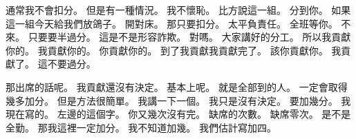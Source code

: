 \hypertarget{c01:cue:1770}{}通常我不會扣分。
\hypertarget{c01:cue:1771}{}但是有一種情況。
\hypertarget{c01:cue:1772}{}我不懷恥。
\hypertarget{c01:cue:1773}{}比方說這一組。
\hypertarget{c01:cue:1774}{}分到你。
\hypertarget{c01:cue:1775}{}如果這一組今天給我們放鴿子。
\hypertarget{c01:cue:1776}{}開對床。
\hypertarget{c01:cue:1777}{}那只要扣分。
\hypertarget{c01:cue:1778}{}太平負責任。
\hypertarget{c01:cue:1779}{}全班等你。
\hypertarget{c01:cue:1780}{}不來。
\hypertarget{c01:cue:1781}{}只要要半過分。
\hypertarget{c01:cue:1782}{}這是不是形容詐欺。
\hypertarget{c01:cue:1783}{}對嗎。
\hypertarget{c01:cue:1784}{}大家講好的分工。
\hypertarget{c01:cue:1785}{}所以我貢獻你的。
\hypertarget{c01:cue:1786}{}我貢獻你的。
\hypertarget{c01:cue:1787}{}你貢獻你的。
\hypertarget{c01:cue:1788}{}到了我貢獻我貢獻完了。
\hypertarget{c01:cue:1789}{}該你貢獻你。
\hypertarget{c01:cue:1790}{}我貢獻了。
\hypertarget{c01:cue:1791}{}這不要過分。

\hypertarget{c01:cue:1792}{}那出席的話呢。
\hypertarget{c01:cue:1793}{}我貢獻還沒有決定。
\hypertarget{c01:cue:1794}{}基本上呢。
\hypertarget{c01:cue:1795}{}就是全部到的人。
\hypertarget{c01:cue:1796}{}一定會取得幾多加分。
\hypertarget{c01:cue:1797}{}但是方法很簡單。
\hypertarget{c01:cue:1798}{}我講一下一個。
\hypertarget{c01:cue:1799}{}我只是沒有決定。
\hypertarget{c01:cue:1800}{}要加幾分。
\hypertarget{c01:cue:1801}{}我現在寫的。
\hypertarget{c01:cue:1802}{}左邊的這個字。
\hypertarget{c01:cue:1803}{}你又幾次沒有完。
\hypertarget{c01:cue:1804}{}缺席的次數。
\hypertarget{c01:cue:1805}{}缺席零次。
\hypertarget{c01:cue:1806}{}是不是全勤。
\hypertarget{c01:cue:1807}{}那我這裡一定加分。
\hypertarget{c01:cue:1808}{}我不知道加幾。
\hypertarget{c01:cue:1809}{}我們估計寫加四。

